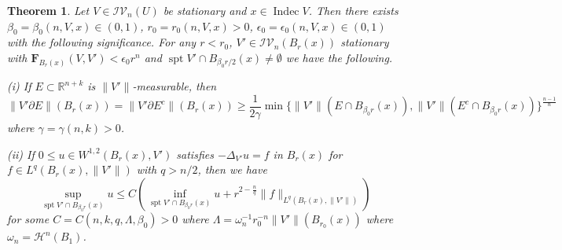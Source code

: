\documentclass[11pt]{amsart}
\newtheorem{theorem}{Theorem}[section]
\theoremstyle{definition}
\newcommand{\HH}{\mathcal{H}}
\newcommand{\R}{\mathbb{R}}
\newcommand{\IV}{\mathcal{IV}}
\DeclareMathOperator{\spt}{spt}
\DeclareMathOperator{\indec}{Indec}
\begin{document}
\begin{theorem}
	Let $V\in \IV_n(U)$ be stationary and $x\in \indec V$. Then there exists $\beta_0=\beta_0(n,V,x)\in(0,1)$, $r_0=r_0(n,V,x)>0$, $\epsilon_0=\epsilon_0(n,V,x)\in(0,1)$ with the following significance.  For any $r<r_0$, $V'\in \IV_n(B_r(x))$ stationary  with $\mathbf{F}_{B_r(x)}(V,V')<\epsilon_0 r^n$ and $\spt V'\cap B_{\beta_0 r/2}(x)\neq\emptyset$ we have the following. 
    
    (i) If $E\subset \R^{n+k}$ is $\|V'\|$-measurable, then
	\[\|V'\partial E\|(B_r(x))=\|V'\partial E^c\|(B_r(x))\ge \frac{1}{2\gamma}\min\{\|V'\|( E\cap B_{\beta_0 r}(x)),\|V'\|(E^c\cap B_{\beta_0 r}(x))\}^{\frac{n-1}{n}}\]
    where $\gamma=\gamma(n,k)>0$.
    
    (ii) If $0\le u\in W^{1,2}(B_{r}(x),V')$ satisfies $-\Delta_{V'}u=f$ in $B_{r}(x)$ for $f\in L^{q}(B_r(x),\|V'\|)$ with $q>n/2$, then we have 
    \[
    \sup_{\spt V'\cap B_{\beta_0 r}(x)}u\le C(\inf_{\spt V'\cap B_{\beta_0 r}(x)} u+r^{2-\frac{n}{q}}\|f\|_{L^{q}(B_r(x),\|V'\|)})
    \]
    for some $C=C(n,k,q,\Lambda,\beta_0)>0$ where $\Lambda=\omega_n^{-1}r_0^{-n}\|V'\|(B_{r_0}(x))$ where $\omega_n=\HH^{n}(B_1)$.
\end{theorem}
\end{document}
